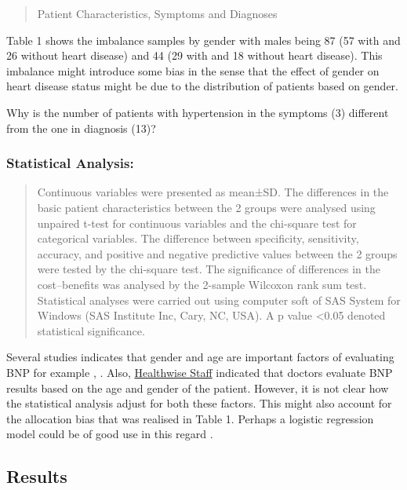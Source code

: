 \documentclass[11pt]{article}
\begin{document}
\begin{quote}
Patient Characteristics, Symptoms and Diagnoses
\end{quote}

Table 1 shows the imbalance samples by gender with males being 87 (57
with and 26 without heart disease) and 44 (29 with and 18 without heart
disease). This imbalance might introduce some bias in the sense that the
effect of gender on heart disease status might be due to the
distribution of patients based on gender.

Why is the number of patients with hypertension in the symptoms (3)
different from the one in diagnosis (13)?

\hypertarget{statistical-analysis}{%
\subsubsection{\texorpdfstring{\textbf{Statistical
Analysis:}}{Statistical Analysis:}}\label{statistical-analysis}}

\begin{quote}
Continuous variables were presented as mean±SD. The differences in the
basic patient characteristics between the 2 groups were analysed using
unpaired t-test for continuous variables and the chi-square test for
categorical variables. The difference between specificity, sensitivity,
accuracy, and positive and negative predictive values between the 2
groups were tested by the chi-square test. The significance of
differences in the cost--benefits was analysed by the 2-sample Wilcoxon
rank sum test. Statistical analyses were carried out using computer soft
of SAS System for Windows (SAS Institute Inc, Cary, NC, USA). A p value
\textless0.05 denoted statistical significance.
\end{quote}

Several studies indicates that gender and age are important factors of
evaluating BNP for example \cite{4980048/SXJ7IXWM},
\cite{4980048/7XLWEEHW}. Also,
\href{https://www.cham.org/HealthwiseArticle.aspx?id=ux1072\#ux1079}{Healthwise
Staff} indicated that doctors evaluate BNP results based on the age and
gender of the patient. However, it is not clear how the statistical
analysis adjust for both these factors. This might also account for the
allocation bias that was realised in Table 1. Perhaps a logistic
regression model could be of good use in this regard \cite{undefined}.

    \hypertarget{results}{%
\subsection{Results}\label{results}}
\end{document}
